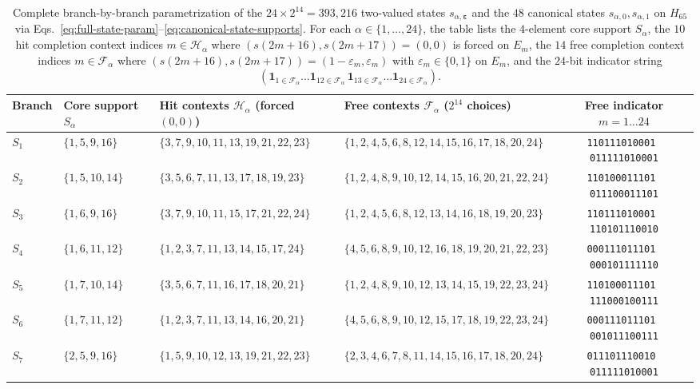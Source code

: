 \documentclass[
  aps,
  pra,
  reprint,
  superscriptaddress,
  amsmath,
  amssymb,
  nofootinbib,
  floatfix
]{revtex4-2}
\theoremstyle{definition}
\theoremstyle{remark}
\begin{document}
\begin{table}[t]
\caption{Complete branch-by-branch parametrization of the $24\times 2^{14}=393{,}216$ two-valued states $s_{\alpha,\bm{\varepsilon}}$ and the $48$ canonical states $s_{\alpha,0},s_{\alpha,1}$ on $H_{65}$ via Eqs.~\eqref{eq:full-state-param}--\eqref{eq:canonical-state-supports}. For each $\alpha\in\{1,\ldots,24\}$, the table lists the $4$-element core support $S_\alpha$, the $10$ hit completion context indices $m\in \mathcal{H}_\alpha$ where $(s(2m+16),s(2m+17))=(0,0)$ is forced on $E_m$, the $14$ free completion context indices $m\in \mathcal{F}_\alpha$ where $(s(2m+16),s(2m+17))=(1-\varepsilon_m,\varepsilon_m)$ with $\varepsilon_m\in\{0,1\}$ on $E_m$, and the $24$-bit indicator string $(\mathbf{1}_{1\in \mathcal{F}_\alpha}\ldots\mathbf{1}_{12\in \mathcal{F}_\alpha}\,\mathbf{1}_{13\in \mathcal{F}_\alpha}\ldots\mathbf{1}_{24\in \mathcal{F}_\alpha})$.}\label{tab:app-h65-state-branches}
\scriptsize
\begin{ruledtabular}
\begin{tabular}{llllc}
Branch & Core support $S_\alpha$ & Hit contexts $\mathcal{H}_\alpha$ (forced $(0,0)$) & Free contexts $\mathcal{F}_\alpha$ ($2^{14}$ choices) & Free indicator $m=1\ldots 24$ \\ \hline
$S_{1}$ & $\{1,5,9,16\}$ & $\{3,7,9,10,11,13,19,21,22,23\}$ & $\{1,2,4,5,6,8,12,14,15,16,17,18,20,24\}$ & \texttt{110111010001\,011111010001} \\
$S_{2}$ & $\{1,5,10,14\}$ & $\{3,5,6,7,11,13,17,18,19,23\}$ & $\{1,2,4,8,9,10,12,14,15,16,20,21,22,24\}$ & \texttt{110100011101\,011100011101} \\
$S_{3}$ & $\{1,6,9,16\}$ & $\{3,7,9,10,11,15,17,21,22,24\}$ & $\{1,2,4,5,6,8,12,13,14,16,18,19,20,23\}$ & \texttt{110111010001\,110101110010} \\
$S_{4}$ & $\{1,6,11,12\}$ & $\{1,2,3,7,11,13,14,15,17,24\}$ & $\{4,5,6,8,9,10,12,16,18,19,20,21,22,23\}$ & \texttt{000111011101\,000101111110} \\
$S_{5}$ & $\{1,7,10,14\}$ & $\{3,5,6,7,11,16,17,18,20,21\}$ & $\{1,2,4,8,9,10,12,13,14,15,19,22,23,24\}$ & \texttt{110100011101\,111000100111} \\
$S_{6}$ & $\{1,7,11,12\}$ & $\{1,2,3,7,11,13,14,16,20,21\}$ & $\{4,5,6,8,9,10,12,15,17,18,19,22,23,24\}$ & \texttt{000111011101\,001011100111} \\
$S_{7}$ & $\{2,5,9,16\}$ & $\{1,5,9,10,12,13,19,21,22,23\}$ & $\{2,3,4,6,7,8,11,14,15,16,17,18,20,24\}$ & \texttt{011101110010\,011111010001} \\

\end{tabular}
\end{ruledtabular}
\end{table}
\end{document}
